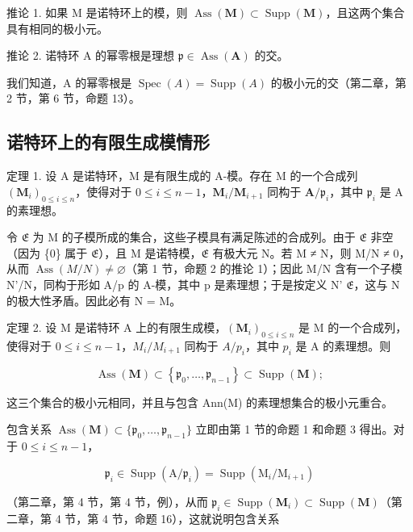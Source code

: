推论 1. 如果 M 是诺特环上的模，则 \(\operatorname{Ass}(\mathbf{M}) \subset \operatorname{Supp}(\mathbf{M})\)，且这两个集合具有相同的极小元。

推论 2. 诺特环 A 的幂零根是理想 \(\mathfrak{p} \in \operatorname{Ass}(\mathbf{A})\) 的交。

我们知道，A 的幂零根是 \(\operatorname{Spec}(A) = \operatorname{Supp}(A)\) 的极小元的交（第二章，第 2 节，第 6 节，命题 13）。

\subsection{诺特环上的有限生成模情形}

定理 1. 设 A 是诺特环，M 是有限生成的 A-模。存在 M 的一个合成列 \((\mathbf{M}_i)_{0\leqslant i\leqslant n}\)，使得对于 \(0\leqslant i\leqslant n - 1\)，\(\mathbf{M}_i / \mathbf{M}_{i + 1}\) 同构于 \(\mathbf{A} / \mathfrak{p}_i\)，其中 \(\mathfrak{p}_i\) 是 A 的素理想。

令 \(\mathfrak{E}\) 为 M 的子模所成的集合，这些子模具有满足陈述的合成列。由于 \(\mathfrak{E}\) 非空（因为 \{0\} 属于 \(\mathfrak{E}\)），且 M 是诺特模，\(\mathfrak{E}\) 有极大元 N。若 M ≠ N，则 M/N ≠ 0，从而 \(\operatorname{Ass}(M/N) \neq \varnothing\)（第 1 节，命题 2 的推论 1）；因此 M/N 含有一个子模 N'/N，同构于形如 A/p 的 A-模，其中 p 是素理想；于是按定义 N' \(\mathfrak{E}\)，这与 N 的极大性矛盾。因此必有 N = M。

定理 2. 设 M 是诺特环 A 上的有限生成模，\((\mathbf{M}_{i})_{0\leqslant i\leqslant n}\) 是 M 的一个合成列，使得对于 \(0\leqslant i\leqslant n-1\)，\(M_{i}/M_{i+1}\) 同构于 \(A/p_{i}\)，其中 \(p_{i}\) 是 A 的素理想。则

\[
\operatorname{Ass} (\mathbf {M}) \subset \left\{\mathfrak {p} _ {0}, \dots , \mathfrak {p} _ {n - 1} \right\} \subset \operatorname{Supp} (\mathbf {M});\tag{4}
\]

这三个集合的极小元相同，并且与包含 Ann(M) 的素理想集合的极小元重合。

包含关系 \(\operatorname{Ass}(\mathbf{M}) \subset \{\mathfrak{p}_0, \ldots, \mathfrak{p}_{n-1}\}\) 立即由第 1 节的命题 1 和命题 3 得出。对于 \(0 \leqslant i \leqslant n - 1\)，

\[
\mathfrak {p} _ {i} \in \operatorname{Supp} (\mathrm{A} / \mathfrak {p} _ {i}) = \operatorname{Supp} (\mathrm{M} _ {i} / \mathrm{M} _ {i + 1})
\]

（第二章，第 4 节，第 4 节，例），从而 \(\mathfrak{p}_i \in \operatorname{Supp}(\mathbf{M}_i) \subset \operatorname{Supp}(\mathbf{M})\)（第二章，第 4 节，第 4 节，命题 16），这就说明包含关系

